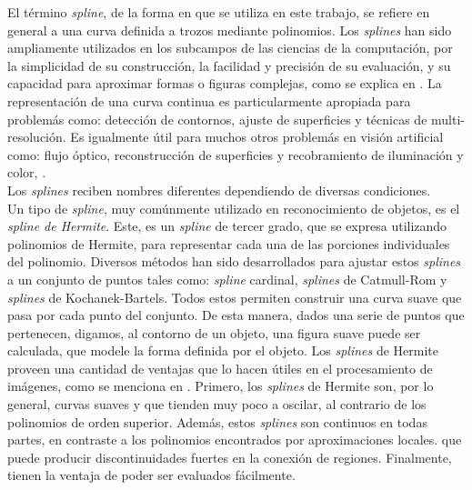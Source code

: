 El t\'ermino \emph{spline}, de la forma en que se utiliza en este trabajo, se refiere en general 
a una curva definida a trozos mediante polinomios. Los \emph{splines} han sido ampliamente
utilizados en los subcampos de las ciencias de la computaci\'on, por la simplicidad de su 
construcci\'on, la facilidad y precisi\'on de su evaluaci\'on, y su capacidad para aproximar
formas o figuras complejas, como se explica en \cite{web:splines}. 
La representaci\'on de una curva continua es particularmente apropiada para problem\'as
como: detecci\'on de contornos, ajuste de superficies y t\'ecnicas de multi-resoluci\'on.
Es igualmente \'util para muchos otros problem\'as en visi\'on artificial como: flujo \'optico,
reconstrucci\'on de superficies y recobramiento de iluminaci\'on y color, \cite[821]{splinespap}.\\

Los \emph{splines} reciben nombres diferentes dependiendo de diversas condiciones.\\
Un tipo de \emph{spline}, muy com\'unmente utilizado en reconocimiento de objetos, es
el \emph{spline de Hermite}. Este, es un \emph{spline} de tercer grado, que se expresa
 utilizando polinomios de Hermite, para representar cada una de las porciones individuales
del polinomio.
Diversos m\'etodos han sido desarrollados para ajustar estos \emph{splines} a un conjunto
de puntos tales como: \emph{spline} cardinal, \emph{splines} de Catmull-Rom y \emph{splines} de
Kochanek-Bartels. Todos estos permiten construir una curva suave que pasa por cada punto
del conjunto. De esta manera, dados una serie de puntos que pertenecen, digamos, al contorno de 
un objeto, una figura suave puede ser calculada, que modele la forma definida por el objeto.
Los \emph{splines} de Hermite proveen una cantidad de ventajas que lo hacen \'utiles 
en el procesamiento de im\'agenes, como se menciona en \cite{splinespap}. Primero,
los \emph{splines} de Hermite son, por lo general, curvas suaves y que tienden muy poco
a oscilar, al contrario de los polinomios de orden superior. Adem\'as, estos \emph{splines} son
continuos en todas partes, en contraste a los polinomios encontrados por aproximaciones locales.
que puede producir discontinuidades fuertes en la 
conexi\'on de regiones. Finalmente, tienen la ventaja de poder ser evaluados f\'acilmente.